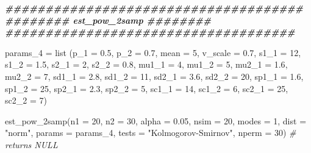 \documentclass[
]{article}
\newenvironment{Shaded}{\begin{snugshade}}{\end{snugshade}}
\newcommand{\AttributeTok}[1]{\textcolor[rgb]{0.77,0.63,0.00}{#1}}
\newcommand{\CommentTok}[1]{\textcolor[rgb]{0.56,0.35,0.01}{\textit{#1}}}
\newcommand{\DecValTok}[1]{\textcolor[rgb]{0.00,0.00,0.81}{#1}}
\newcommand{\DocumentationTok}[1]{\textcolor[rgb]{0.56,0.35,0.01}{\textbf{\textit{#1}}}}
\newcommand{\FloatTok}[1]{\textcolor[rgb]{0.00,0.00,0.81}{#1}}
\newcommand{\FunctionTok}[1]{\textcolor[rgb]{0.00,0.00,0.00}{#1}}
\newcommand{\NormalTok}[1]{#1}
\newcommand{\OtherTok}[1]{\textcolor[rgb]{0.56,0.35,0.01}{#1}}
\newcommand{\StringTok}[1]{\textcolor[rgb]{0.31,0.60,0.02}{#1}}
\begin{document}
\begin{Shaded}
\begin{Highlighting}[]
\DocumentationTok{\#\#\#\#\#\#\#\#\#\#\#\#\#\#\#\#\#\#\#\#\#\#\#\#\#\#\#\#\#\#\#\#\#\#\#\#\#}
\DocumentationTok{\#\#\#\#\#\#\#\# est\_pow\_2samp \#\#\#\#\#\#\#\#}
\DocumentationTok{\#\#\#\#\#\#\#\#\#\#\#\#\#\#\#\#\#\#\#\#\#\#\#\#\#\#\#\#\#\#\#\#\#\#\#\#}

\NormalTok{params\_4 }\OtherTok{=} \FunctionTok{list}\NormalTok{ (}\AttributeTok{p\_1 =} \FloatTok{0.5}\NormalTok{, }\AttributeTok{p\_2 =} \FloatTok{0.7}\NormalTok{,}
                 \AttributeTok{mean =} \DecValTok{5}\NormalTok{, }\AttributeTok{v\_scale =} \FloatTok{0.7}\NormalTok{,}
                 \AttributeTok{s1\_1  =} \DecValTok{12}\NormalTok{, }\AttributeTok{s1\_2 =} \FloatTok{1.5}\NormalTok{,}
                 \AttributeTok{s2\_1 =} \DecValTok{2}\NormalTok{, }\AttributeTok{s2\_2 =} \FloatTok{0.8}\NormalTok{,}
                 \AttributeTok{mu1\_1 =} \DecValTok{4}\NormalTok{, }\AttributeTok{mu1\_2 =} \DecValTok{5}\NormalTok{,}
                 \AttributeTok{mu2\_1 =} \FloatTok{1.6}\NormalTok{, }\AttributeTok{mu2\_2 =} \DecValTok{7}\NormalTok{,}
                 \AttributeTok{sd1\_1 =} \FloatTok{2.8}\NormalTok{, }\AttributeTok{sd1\_2 =} \DecValTok{11}\NormalTok{,}
                 \AttributeTok{sd2\_1 =} \FloatTok{3.6}\NormalTok{, }\AttributeTok{sd2\_2 =} \DecValTok{20}\NormalTok{,}
                 \AttributeTok{sp1\_1 =} \FloatTok{1.6}\NormalTok{, }\AttributeTok{sp1\_2 =} \DecValTok{25}\NormalTok{,}
                 \AttributeTok{sp2\_1 =} \FloatTok{2.3}\NormalTok{, }\AttributeTok{sp2\_2 =} \DecValTok{5}\NormalTok{,}
                 \AttributeTok{sc1\_1 =} \DecValTok{14}\NormalTok{, }\AttributeTok{sc1\_2 =} \DecValTok{6}\NormalTok{,}
                 \AttributeTok{sc2\_1 =} \DecValTok{25}\NormalTok{, }\AttributeTok{sc2\_2 =} \DecValTok{7}\NormalTok{)}

\FunctionTok{est\_pow\_2samp}\NormalTok{(}\AttributeTok{n1 =} \DecValTok{20}\NormalTok{, }\AttributeTok{n2 =} \DecValTok{30}\NormalTok{, }\AttributeTok{alpha =} \FloatTok{0.05}\NormalTok{, }\AttributeTok{nsim =} \DecValTok{20}\NormalTok{, }\AttributeTok{modes =} \DecValTok{1}\NormalTok{, }\AttributeTok{dist =} \StringTok{"norm"}\NormalTok{, }\AttributeTok{params =}\NormalTok{ params\_4, }\AttributeTok{tests =} \StringTok{"Kolmogorov{-}Smirnov"}\NormalTok{, }\AttributeTok{nperm =} \DecValTok{30}\NormalTok{)   }\CommentTok{\# returns NULL}
\end{Highlighting}
\end{Shaded}
\end{document}
